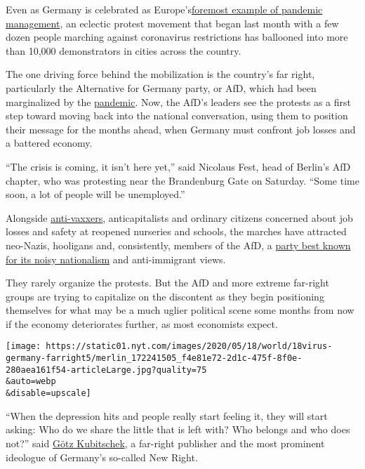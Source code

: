 Even as Germany is celebrated as
Europe's\href{https://www.nytimes.com/2020/04/04/world/europe/germany-coronavirus-death-rate.html}{foremost
example of pandemic management}, an eclectic protest movement that began
last month with a few dozen people marching against coronavirus
restrictions has ballooned into more than 10,000 demonstrators in cities
across the country.

The one driving force behind the mobilization is the country's far
right, particularly the Alternative for Germany party, or AfD, which had
been marginalized by the
\href{https://www.nytimes.com/2020/05/19/world/coronavirus-news.html}{pandemic}.
Now, the AfD's leaders see the protests as a first step toward moving
back into the national conversation, using them to position their
message for the months ahead, when Germany must confront job losses and
a battered economy.

``The crisis is coming, it isn't here yet,'' said Nicolaus Fest, head of
Berlin's AfD chapter, who was protesting near the Brandenburg Gate on
Saturday. ``Some time soon, a lot of people will be unemployed.''

Alongside
\href{https://www.nytimes.com/2020/03/10/health/vaccines-protest-doctors.html}{anti-vaxxers},
anticapitalists and ordinary citizens concerned about job losses and
safety at reopened nurseries and schools, the marches have attracted
neo-Nazis, hooligans and, consistently, members of the AfD, a
\href{https://www.nytimes.com/2017/09/25/world/europe/germany-election-afd.html?action=click\&module=RelatedCoverage\&pgtype=Article\&region=Footer}{party
best known for its noisy nationalism} and anti-immigrant views.

They rarely organize the protests. But the AfD and more extreme
far-right groups are trying to capitalize on the discontent as they
begin positioning themselves for what may be a much uglier political
scene some months from now if the economy deteriorates further, as most
economists expect.

\texttt{[image: https://static01.nyt.com/images/2020/05/18/world/18virus-germany-farright5/merlin\_172241505\_f4e81e72-2d1c-475f-8f0e-280aea161f54-articleLarge.jpg?quality=75\\\&auto=webp\\\&disable=upscale]}

``When the depression hits and people really start feeling it, they will
start asking: Who do we share the little that is left with? Who belongs
and who does not?'' said
\href{https://www.nytimes.com/2017/10/10/magazine/the-prophet-of-germanys-new-right.html?searchResultPosition=3}{Götz
Kubitschek}, a far-right publisher and the most prominent ideologue of
Germany's so-called New Right.


